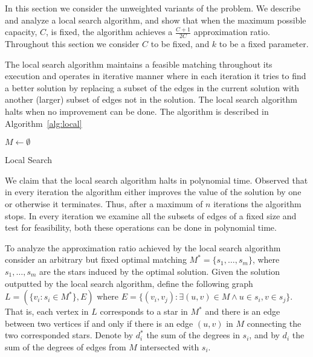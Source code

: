 In this section we consider the unweighted variants of the problem.
We describe and analyze a local search algorithm, 
and show that when the maximum possible capacity, $C$, is fixed, the algorithm achieves 
a $\frac{C + 1}{2C}$ approximation ratio.
Throughout this section we consider $C$ to be fixed, and $k$ to be a fixed parameter.  

The local search algorithm maintains a feasible matching throughout its execution
and operates in 
iterative manner where in each iteration it tries to find a better solution by
replacing a subset of the edges in the current solution with 
another (larger) subset of edges not in the solution.
The local search algorithm halts when no improvement can be done.
The algorithm is described in Algorithm~\ref{alg:local} 

\begin{algorithm}
$M \leftarrow \emptyset$								\\

\caption{
\label{alg:local}
Local Search}
\end{algorithm}


We claim that the local search algorithm halts in polynomial time.
Observed that in every iteration the algorithm either improves the value of the solution
by one or otherwise it terminates. 
Thus, after a maximum of $n$ iterations the algorithm stops.
In every iteration we examine all the subsets of edges of a fixed size and test for feasibility,
both these operations can be done in polynomial time. 

To analyze the approximation ratio achieved by the local search algorithm consider an 
arbitrary but fixed optimal matching $M^* = \{s_1, \ldots, s_m\}$,
where $s_1, \ldots, s_m$ are the stars induced by the optimal solution.
Given the solution outputted by the local search algorithm, 
define the following graph $L = (\{v_i : s_i \in M^* \}, E)$ 
where $E = \{(v_i, v_j) : \exists (u,v) \in M \land u \in s_i, v \in s_j \}$.
That is, each vertex in $L$ corresponds to a star in $M^*$ and there is an edge 
between two vertices if and only if there is an edge $(u,v)$ in $M$ connecting the two 
corresponded stars.
Denote by $d^*_i$ the sum of the degrees in $s_i$, and by $d_i$ the sum of the degrees of 
edges from $M$ intersected with $s_i$. 
